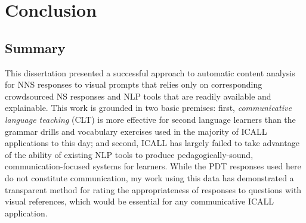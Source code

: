 \chapter{Conclusion}
\label{chap:conclusion}

\section{Summary}
\label{sec:conclusion-summary}


This dissertation presented a successful approach to automatic content analysis for NNS responses to visual prompts that relies only on corresponding crowdsourced NS responses and NLP tools that are readily available and explainable. This work is grounded in two basic premises: first, \textit{communicative language teaching} (CLT) is more effective for second language learners than the grammar drills and vocabulary exercises used in the majority of ICALL applications to this day; and second, ICALL has largely failed to take advantage of the ability of existing NLP tools to produce pedagogically-sound, communication-focused systems for learners. While the PDT responses used here do not constitute communication, my work using this data has demonstrated a transparent method for rating the appropriateness of responses to questions with visual references, which would be essential for any communicative ICALL application.

